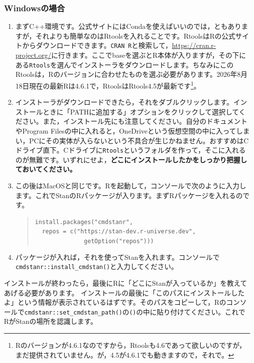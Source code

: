 \documentclass{ltjbook}
\begin{document}
\subsubsection{Windowsの場合}
\begin{enumerate}
    \item まずC++環境です。公式サイトにはCondaを使えばいいのでは，ともありますが，それよりも簡単なのはRtoolsを入れることです。RtoolsはRの公式サイトからダウンロードできます。\verb|CRAN R|と検索して，\url{https://cran.r-project.org/}に行きます。ここでbaseを選ぶとR本体が入りますが，その下にある\verb|Rtools|を選んでインストーラをダウンロードします。ちなみにこのRtoolsは，Rのバージョンに合わせたものを選ぶ必要があります。2026年8月18日現在の最新Rは4.6.1で，RtoolsはRtools4.5が最新です\footnote{Rのバージョンが4.6.1なのですから，Rtoolsも4.6であって欲しいのですが，まだ提供されていません。が，4.5が4.6.1でも動きますので，それで。}。
    \item インストーラがダウンロードできたら，それをダブルクリックします。インストールときに「PATHに追加する」オプションをクリックして選択してください。また，インストール先にも注意してください。自分のドキュメントやProgram Filesの中に入れると，OneDriveという仮想空間の中に入ってしまい，PCにその実体が入らないという不具合が生じかねません。おすすめはCドライブ直下。Cドライブに\verb|Rtools|というフォルダを作って，そこに入れるのが無難です。いずれにせよ，\textbf{どこにインストールしたかをしっかり把握しておいてください。}
    \item この後はMacOSと同じです。Rを起動して，コンソールで次のように入力します。これでStanのRパッケージが入ります。まずRパッケージを入れるのです。
\begin{quote}
\texttt{install.packages("cmdstanr",}\\
\texttt{\ \ repos = c("https://stan-dev.r-universe.dev",}\\
\texttt{\ \ \ \ \ \ \ \ \ \ \ \ \ \ getOption("repos")))}
\end{quote}

    \item パッケージが入れば，それを使ってStanを入れます。コンソールで\verb|cmdstanr::install_cmdstan()|と入力してください。
\end{enumerate}

インストールが終わったら，最後にRに「どこにStanが入っているか」を教えてあげる必要があります。
インストールの最後に「このパスにインストールしたよ」という情報が表示されているはずです。そのパスをコピーして，Rのコンソールで\verb|cmdstanr::set_cmdstan_path()|の\verb|()|の中に貼り付けてください。これでRがStanの場所を認識します。
\end{document}
